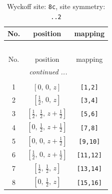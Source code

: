 \documentclass[fleqn,8pt]{jsarticle}
\begin{document}
\renewcommand{\arraystretch}{1.2}
\begin{longtable}{ccc}
\caption{Wyckoff site: {\tt 8c}, site symmetry: {\tt ..2}}
 \\
 \hline \hline
No. & position & mapping \\ \hline \endfirsthead

\multicolumn{2}{l}{\tablename\ \thetable{}} \\
 \hline \hline
No. & position & mapping \\ \hline \endhead

 \hline \hline
\multicolumn{2}{r}{\footnotesize\it continued ...} \\ \endfoot

 \hline \hline
\multicolumn{2}{r}{} \\ \endlastfoot

1 & $\left[ 0,\, 0,\, z \right]$ & {\tt [1,2]} \\ \hline
2 & $\left[ \frac{1}{2},\, 0,\, z \right]$ & {\tt [3,4]} \\ \hline
3 & $\left[ \frac{1}{2},\, \frac{1}{2},\, z + \frac{1}{2} \right]$ & {\tt [5,6]} \\ \hline
4 & $\left[ 0,\, \frac{1}{2},\, z + \frac{1}{2} \right]$ & {\tt [7,8]} \\ \hline
5 & $\left[ 0,\, 0,\, z + \frac{1}{2} \right]$ & {\tt [9,10]} \\ \hline
6 & $\left[ \frac{1}{2},\, 0,\, z + \frac{1}{2} \right]$ & {\tt [11,12]} \\ \hline
7 & $\left[ \frac{1}{2},\, \frac{1}{2},\, z \right]$ & {\tt [13,14]} \\ \hline
8 & $\left[ 0,\, \frac{1}{2},\, z \right]$ & {\tt [15,16]} \\
\end{longtable}
\renewcommand{\arraystretch}{1.2}
\end{document}
